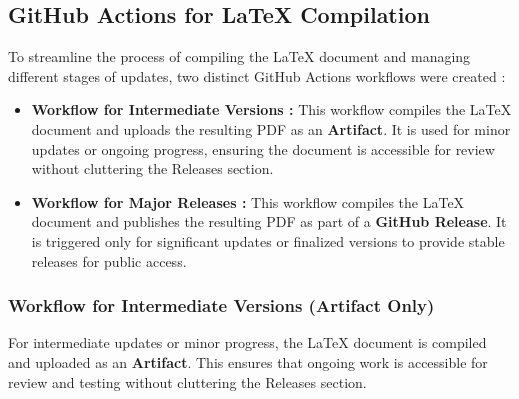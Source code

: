 \documentclass[12pt]{article}
\begin{document}
\subsection{GitHub Actions for LaTeX Compilation}

To streamline the process of compiling the LaTeX document and managing different stages of updates, two distinct GitHub Actions workflows were created :

\begin{itemize}
    \item \textbf{Workflow for Intermediate Versions :}
    This workflow compiles the LaTeX document and uploads the resulting PDF as an \textbf{Artifact}. It is used for minor updates or ongoing progress, ensuring the document is accessible for review without cluttering the Releases section.
    
    \item \textbf{Workflow for Major Releases :}
    This workflow compiles the LaTeX document and publishes the resulting PDF as part of a \textbf{GitHub Release}. It is triggered only for significant updates or finalized versions to provide stable releases for public access.
\end{itemize}

\subsubsection{Workflow for Intermediate Versions (Artifact Only)}

For intermediate updates or minor progress, the LaTeX document is compiled and uploaded as an \textbf{Artifact}. This ensures that ongoing work is accessible for review and testing without cluttering the Releases section.
\end{document}
